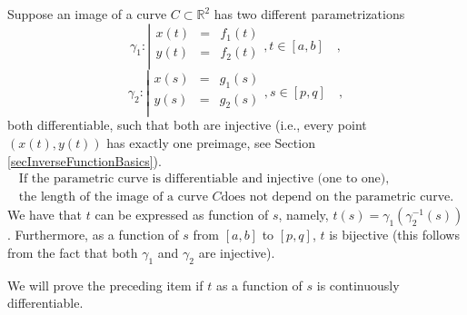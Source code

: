\documentclass[12pt]{book}
\begin{document}
Suppose an image of a curve $C\subset \mathbb R^2$ has two different parametrizations
\begin{equation}\label{eqDefCurve1}
\gamma_1:\left|
\begin{array}{rcl}
x(t)&=&f_1(t)\\
y(t)&=&f_2(t)\\
\end{array}\right., t\in [a,b]\quad ,
\end{equation}
\begin{equation}\label{eqDefCurve2}
\gamma_2:\left|
\begin{array}{rcl}
x(s)&=&g_1(s)\\
y(s)&=&g_2(s)\\
\end{array}\right. , s\in [p,q]\quad ,
\end{equation}
both differentiable, such that both are injective (i.e., every point $(x(t), y(t))$ has exactly one preimage, see Section \ref{secInverseFunctionBasics}).
\begin{equation}\boxed{
\begin{array}{c}
\text{If the parametric curve is differentiable and injective (one to one),}\\
\text{the length of the image of a curve } C
\text{does not depend on the parametric curve.}
\end{array}
}
\end{equation}
We have that $t$ can be expressed as function of $s$, namely, $t(s)= \gamma_1(\gamma_2^{-1}(s))$. Furthermore, as a function of $s$ from $[a,b]$ to $[p,q]$, $t$ is bijective (this follows from the fact that both $\gamma_1$ and $\gamma_2$ are injective).

We will prove the preceding item if $t$ as a function of $s$ is  continuously differentiable.
\end{document}
